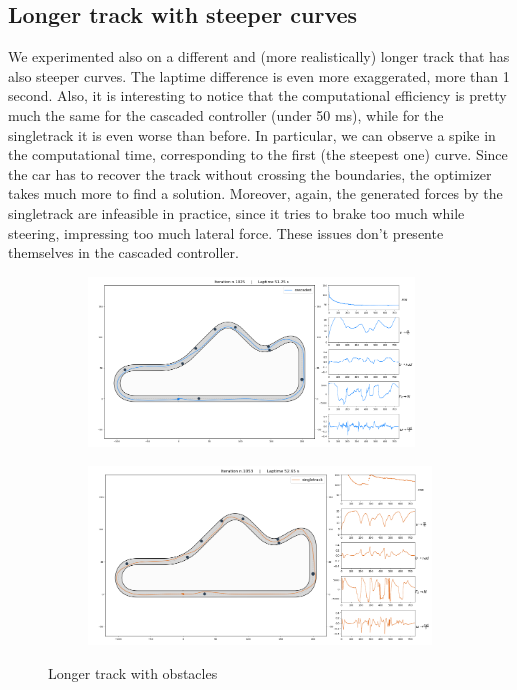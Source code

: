 \documentclass[a4paper, onecolumn, 12pt]{article}
\begin{document}
\subsection{Longer track with steeper curves}

We experimented also on a different and (more realistically) longer track that
has also steeper curves. The laptime difference is even more exaggerated, more
than 1 second. Also, it is interesting to notice that the computational
efficiency is pretty much the same for the cascaded controller (under 50 ms),
while for the singletrack it is even worse than before. In particular, we can
observe a spike in the computational time, corresponding to the first (the
steepest one) curve. Since the car has to recover the track without crossing the
boundaries, the optimizer takes much more to find a solution. Moreover, again,
the generated forces by the singletrack are infeasible in practice, since it
tries to brake too much while steering, impressing too much lateral force. These
issues don't presente themselves in the cascaded controller. 
\begin{figure}[H]
    \centering
    \begin{subfigure}{0.9\textwidth}
        \centering
        \includegraphics[width=0.95\textwidth]{assets/obstacles_shoe.png}
    \end{subfigure}
    \begin{subfigure}{0.9\textwidth}
        \centering
        \includegraphics[width=\textwidth]{assets/singletrack_obstacles_shoe.png}
    \end{subfigure}
    \caption{Longer track with obstacles}
\end{figure}
\end{document}
